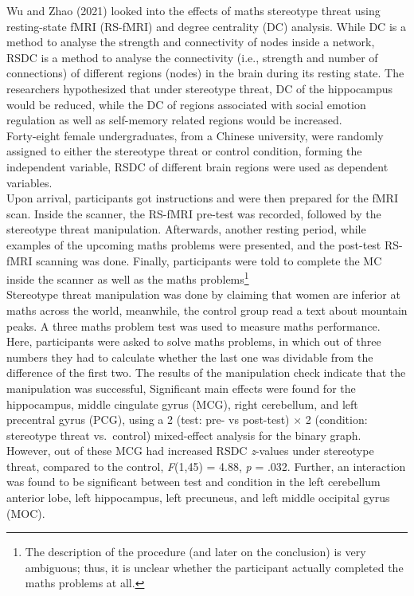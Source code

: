 \documentclass[
  stu,floatsintext]{apa7}
\begin{document}
Wu and Zhao (2021) looked into the effects of maths stereotype threat using resting-state fMRI (RS-fMRI) and degree centrality (DC) analysis.
While DC is a method to analyse the strength and connectivity of nodes inside a network, RSDC is a method to analyse the connectivity (i.e., strength and number of connections) of different regions (nodes) in the brain during its resting state.
The researchers hypothesized that under stereotype threat, DC of the hippocampus would be reduced, while the DC of regions associated with social emotion regulation as well as self-memory related regions would be increased.\\
Forty-eight female undergraduates, from a Chinese university, were randomly assigned to either the stereotype threat or control condition, forming the independent variable, RSDC of different brain regions were used as dependent variables.\\
Upon arrival, participants got instructions and were then prepared for the fMRI scan.
Inside the scanner, the RS-fMRI pre-test was recorded, followed by the stereotype threat manipulation.
Afterwards, another resting period, while examples of the upcoming maths problems were presented, and the post-test RS-fMRI scanning was done.
Finally, participants were told to complete the MC inside the scanner as well as the maths problems\footnote{The description of the procedure (and later on the conclusion) is very ambiguous; thus, it is unclear whether the participant actually completed the maths problems at all.}\\
Stereotype threat manipulation was done by claiming that women are inferior at maths across the world, meanwhile, the control group read a text about mountain peaks.
A three maths problem test was used to measure maths performance.
Here, participants were asked to solve maths problems, in which out of three numbers they had to calculate whether the last one was dividable from the difference of the first two.
The results of the manipulation check indicate that the manipulation was successful,
Significant main effects were found for the hippocampus, middle cingulate gyrus (MCG), right cerebellum, and left precentral gyrus (PCG), using a 2 (test: pre- vs post-test) \(\times\) 2 (condition: stereotype threat vs.~control) mixed-effect analysis for the binary graph.
However, out of these MCG had increased RSDC \emph{z}-values under stereotype threat, compared to the control, \emph{F}(1,45) = 4.88, \emph{p} = .032.
Further, an interaction was found to be significant between test and condition in the left cerebellum anterior lobe, left hippocampus, left precuneus, and left middle occipital gyrus (MOC).
\end{document}
